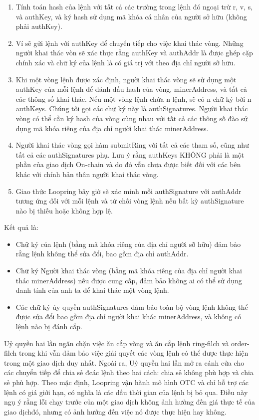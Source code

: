\documentclass[12pt,a4paper]{article}
\begin{document}
\begin{multicols}{2}
\begin{enumerate}
	\item Tính toán hash của lệnh với tất cả các trường trong lệnh đó ngoại trừ r,  v,  s,  và  authKey, và ký hash sử dụng mã khóa cá nhân của người sở hữu (không phải authKey).

	\item Ví sẽ gửi lệnh với authKey để chuyển tiếp cho việc khai thác vòng. Những người khai thác vòn sẽ xác thực rằng authKey và authAddr là được ghép cặp chính xác và chữ ký của lệnh là có giá trị với theo địa chỉ người sỡ hữu.

	\item Khi một vòng lệnh được xác định, người khai thác vòng sẽ sử dụng một authKey của mỗi lệnh để đánh dấu hash của vòng, minerAddress, và tất cả các thông số khai thác. Nếu một vòng lệnh chứa n lệnh, sẽ có n chữ ký bởi n authKeys.  Chúng tôi gọi các chữ ký này là authSignatures.  Người khai thác vòng có thể cần ký hash của vòng cùng nhau với tất cả các thông số đào sử dụng mã khóa riêng của địa chỉ người khai thác minerAddress.

	\item Người khai thác vòng gọi hàm submitRing với tất cả các tham số, cũng như tất cả các authSignatures phụ. Lưu ý rằng authKeys KHÔNG phải là một phần của giao dịch On-chain và do đó vẫn chưa được biết đối với các bên khác với chính bản thân người khai thác vòng.


	\item Giao thức Loopring bây giờ sẽ xác minh mỗi authSignature với authAddr tương ứng đối với mỗi lệnh và từ chối vòng lệnh nếu bất kỳ authSignature nào bị thiếu hoặc không hợp lệ.

\end{enumerate}
Kết quả là:
\begin{itemize}

	\item  Chữ ký của lệnh (bằng mã khóa riêng của địa chỉ người sỡ hữu) đảm bảo rằng lệnh không thể sửa đổi, bao gồm địa chỉ authAddr.
	\item  Chữ ký Người khai thác vòng (bằng mã khóa riêng của địa chỉ người khai thác minerAddress) nếu được cung cấp, đảm bảo không ai có thể sử dụng danh tính của anh ta để khai thác một vòng lệnh.
	\item  Các chữ ký ủy quyền authSignatures  đảm bảo toàn bộ vòng lệnh không thể được sửa đổi bao gồm  địa chỉ người khai khác minerAddress, và không có lệnh nào bị đánh cắp.

\end{itemize}
Uỷ quyền hai lần ngăn chặn việc ăn cắp vòng và ăn cắp lệnh ring-filch và order-filch trong khi vẫn đảm bảo việc giải quyết các vòng lệnh có thể được thực hiện trong một giao dịch duy nhất. Ngoài ra, Uỷ quyền hai lần mở ra cánh cửa cho các chuyển tiếp để chia sẻ đcác lệnh theo hai cách: chia sẻ không phù hợp và chia sẻ phù hợp. Theo mặc định, Loopring vận hành mô hình OTC và chỉ hỗ trợ các lệnh có giá giới hạn, có nghĩa là các dấu thời gian của lệnh bị bỏ qua. Điều này ngụ ý rằng lỗi chạy trước của một giao dịch không ảnh hưởng đến giá thực tế của giao dịchđó, nhưng có ảnh hưởng đến việc nó được thực hiện hay không.

\end{multicols}
\end{document}
